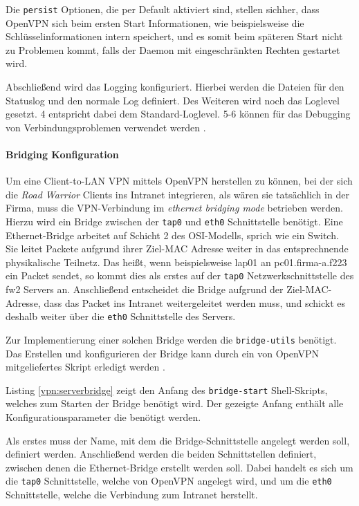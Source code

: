 Die \texttt{persist} Optionen, die per Default aktiviert sind, stellen sichher, dass OpenVPN sich beim ersten Start Informationen, wie beispielsweise die Schlüsselinformationen intern speichert, und es somit beim späteren Start nicht zu Problemen kommt, falls der Daemon mit eingeschränkten Rechten gestartet wird.

Abschließend wird das Logging konfiguriert. Hierbei werden die Dateien für den Statuslog und den normale Log definiert. Des Weiteren wird noch das Loglevel gesetzt. 4 entspricht dabei dem Standard-Loglevel. 5-6 können für das Debugging von Verbindungsproblemen verwendet werden \cite{OpenVPN}.

\paragraph{Bridging Konfiguration}

Um eine Client-to-LAN VPN mittels OpenVPN herstellen zu können, bei der sich die \emph{Road Warrior} Clients ins Intranet integrieren, als wären sie tatsächlich in der Firma, muss die VPN-Verbindung im \emph{ethernet bridging mode} betrieben werden. Hierzu wird ein Bridge zwischen der \texttt{tap0} und \texttt{eth0} Schnittstelle benötigt. Eine Ethernet-Bridge arbeitet auf Schicht 2 des OSI-Modells, sprich wie ein Switch. Sie leitet Packete aufgrund ihrer Ziel-MAC Adresse weiter in das entsprechnende physikalische Teilnetz. Das heißt, wenn beispielsweise lap01 an pc01.firma-a.f223 ein Packet sendet, so kommt dies als erstes auf der \texttt{tap0} Netzwerkschnittstelle des fw2 Servers an. Anschließend entscheidet die Bridge aufgrund der Ziel-MAC-Adresse, dass das Packet ins Intranet weitergeleitet werden muss, und schickt es deshalb weiter über die \texttt{eth0} Schnittstelle des Servers.

Zur Implementierung einer solchen Bridge werden die \texttt{bridge-utils} benötigt. Das Erstellen und konfigurieren der Bridge kann durch ein von OpenVPN mitgeliefertes Skript erledigt werden \cite{OpenVPN}.



Listing \ref{vpn:serverbridge} zeigt den Anfang des \texttt{bridge-start} Shell-Skripts, welches zum Starten der Bridge benötigt wird. Der gezeigte Anfang enthält alle Konfigurationsparameter die benötigt werden.

Als erstes muss der Name, mit dem die Bridge-Schnittstelle angelegt werden soll, definiert werden. Anschließend werden die beiden Schnittstellen definiert, zwischen denen die Ethernet-Bridge erstellt werden soll. Dabei handelt es sich um die \texttt{tap0} Schnittstelle, welche von OpenVPN angelegt wird, und um die \texttt{eth0} Schnittstelle, welche die Verbindung zum Intranet herstellt.

